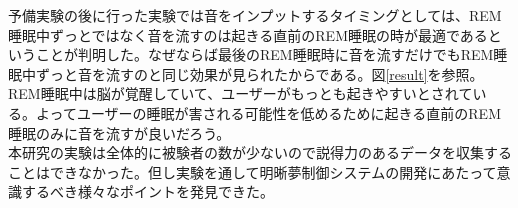 予備実験の後に行った実験では音をインプットするタイミングとしては、REM睡眠中ずっとではなく音を流すのは起きる直前のREM睡眠の時が最適であるということが判明した。なぜならば最後のREM睡眠時に音を流すだけでもREM睡眠中ずっと音を流すのと同じ効果が見られたからである。図\ref{result}を参照。REM睡眠中は脳が覚醒していて、ユーザーがもっとも起きやすいとされている\cite{remNonRem}。よってユーザーの睡眠が害される可能性を低めるために起きる直前のREM睡眠のみに音を流すが良いだろう。\\

本研究の実験は全体的に被験者の数が少ないので説得力のあるデータを収集することはできなかった。但し実験を通して明晰夢制御システムの開発にあたって意識するべき様々なポイントを発見できた。